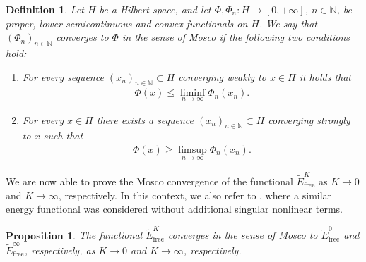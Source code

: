 \documentclass[11pt,reqno]{amsart}
\newtheorem{definition}[theorem]{Definition}
\newtheorem{proposition}[theorem]{Proposition}
\theoremstyle{remark}
\numberwithin{equation}{section}
\newcommand{\N}{\mathbb N}
\newcommand{\free}{\mathrm{free}}
\begin{document}
\begin{definition}
    Let $H$ be a Hilbert space, and let $\Phi,\Phi_n:H\rightarrow [0,+\infty]$, $n\in\N$, be proper, lower semicontinuous and convex functionals on $H$. We say that $(\Phi_n)_{n\in\N}$ converges to $\Phi$ in the sense of Mosco if the following two conditions hold:
    \begin{enumerate}[label=\textnormal{\bfseries(M\arabic*)}]
        \item \label{Mosco1} For every sequence $(x_n)_{n\in\N}\subset H$ converging weakly to $x\in H$ it holds that
        \begin{align*}
            \Phi(x) \leq \liminf_{n\rightarrow\infty} \Phi_n(x_n).
        \end{align*}
        \item \label{Mosco2} For every $x\in H$ there exists a sequence $(x_n)_{n\in\N}\subset H$ converging strongly to $x$ such that
        \begin{align*}
            \Phi(x) \geq \limsup_{n\rightarrow\infty} \Phi_n(x_n).
        \end{align*}
    \end{enumerate}
\end{definition}



We are now able to prove the Mosco convergence of the functional $\widetilde E_\free^K$ as $K\rightarrow 0$ and $K\rightarrow\infty$, respectively. In this context, we also refer to \cite{Fukao2026}, where a similar energy functional was considered without additional singular nonlinear terms.
\begin{proposition}\label{Proposition:MoscoConvergence}
    The functional $\widetilde E_\free^K$ converges in the sense of Mosco to $\widetilde E_\free^0$ and $\widetilde E_\free^\infty$, respectively, as $K\rightarrow 0$ and $K\rightarrow\infty$, respectively.
\end{proposition}
\end{document}
